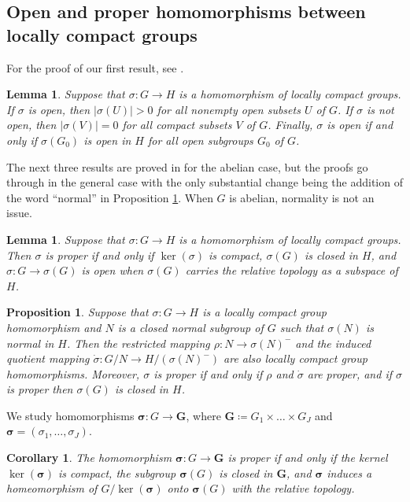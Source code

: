 \documentclass[12pt,twoside,a4paper]{amsart}
\newtheorem{lem}[thm]{Lemma}%
\newtheorem{prop}[thm]{Proposition}%
\newtheorem{cor}[thm]{Corollary}%
\theoremstyle{definition}
\theoremstyle{remark}
\numberwithin{equation}{section}
\newcommand{\afterbar}{^-}
\newcommand{\bss}{\boldsymbol{\sigma}}
\newcommand{\bsG}{\boldsymbol{G}}
\begin{document}
\subsection{Open and proper homomorphisms between locally compact groups}
For the proof of our first result, see \cite{CHM24}.

\begin{lem}\label{lem:good-or-bad}
Suppose that $\sigma\colon  G \to H$ is a homomorphism of locally compact groups.
If $\sigma$ is open, then $|\sigma(U)| > 0$ for all nonempty open subsets $U$ of $G$.
If $\sigma$ is not open, then $|\sigma(V)| = 0$ for all compact subsets $V$ of $G$.
Finally, $\sigma$ is open if and only if $\sigma(G_0)$ is open in $H$ for all open subgroups $G_0$ of $G$.
\end{lem}

The next three results are proved in \cite{BC25} for the abelian case, but the proofs go through in the general case with the only substantial change being the addition of the word ``normal'' in Proposition \ref{prop:new-homos-from-old}.
When $G$ is abelian, normality is not an issue.


\begin{lem}\label{lem:proper-homos}  
Suppose that $\sigma\colon  G \to H$ is a homomorphism of locally compact groups.
Then $\sigma$ is proper if and only if $\ker(\sigma)$ is compact, $\sigma(G)$ is closed in $H$, and $\sigma\colon  G \to \sigma(G)$ is open when $\sigma(G)$ carries the relative topology as a subspace of $H$.
\end{lem}

\begin{prop}\label{prop:new-homos-from-old}
Suppose that $\sigma\colon G \to H$ is a locally compact group homomorphism and $N$ is a closed normal subgroup of $G$ such that $\sigma(N)$ is normal in $H$. 
Then the restricted mapping $\rho\colon  N \to {\sigma(N)}\afterbar$ and the induced quotient mapping $\dot\sigma\colon  G/N \to H/({\sigma(N)}\afterbar)$ are also locally compact group homo\-mor\-phisms.
Moreover, $\sigma$ is proper if and only if $\rho$ and $\dot{\sigma}$ are proper, and if $\sigma$ is proper then $\sigma(G)$ is closed in $H$.
\end{prop}


We study homomorphisms $\bss\colon G\to \bsG $, where $\bsG \coloneqq G_1\times\dots \times G_J$ and $\bss = (\sigma_1, \dots, \sigma_J)$.

\begin{cor}\label{open}
The homomorphism $\bss\colon G\to \bsG $ is proper if and only if  the kernel $\ker(\bss)$ is compact, the subgroup $\bss(G)$ is closed in $\bsG $, and $\bss$ induces a homeomorphism of $G/\ker(\bss)$ onto $\bss(G)$ with the relative topology.
\end{cor}
\end{document}
